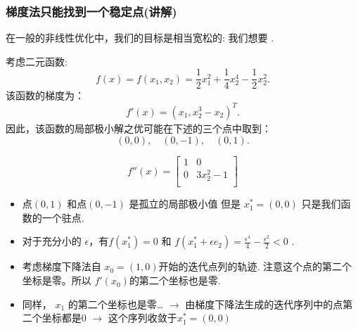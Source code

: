 \documentclass[handout]{beamer}
\begin{document}
\begin{frame}[allowframebreaks]
\frametitle{梯度法只能找到一个稳定点(讲解)}

 在一般的非线性优化中，我们的目标是相当宽松的:
我们想要 .


\begin{example}\label{example_1_2_2}
    考虑二元函数:
    $$
        f(x) = f(x_1,x_2) = \frac{1}{2}x_1^2 + \frac{1}{4} x_2^4 - \frac{1}{2} x_2^2.
    $$
   该函数的梯度为：
    $$
        f'(x) = (x_1,x_2^3 - x_2)_{}^{T}.
     $$
    因此，该函数的局部极小解之优可能在下述的三个点中取到：
    $$
        (0,0), \quad (0,-1), \quad (0,1).
    $$
\end{example}
\framebreak
{}
    $$
        f''(x) = \left[\begin{array}{cc}
                    1 & 0 \\
                    0 & 3x_2^2 -1 \\
                     \end{array}\right]
    $$


\begin{itemize}
\item   点$(0,1)$ 和点$(0,-1)$ 是孤立的局部极小值
但是 $x_1^*=(0,0)$ 只是我们函数的一个驻点.
   \item 对于充分小的 $\epsilon$，有$f(x_1^*) = 0$ 和 $f(x_1^* + \epsilon e_2) = \frac{\epsilon^4}{4} - \frac{\epsilon^2}{2}<0$  .

    \item 考虑梯度下降法自 $x_0 = (1,0)$开始的迭代点列的轨迹.
    注意这个点的第二个坐标是零。所以 $f'(x_0)$的第二个坐标也是零.
   \item 同样， $x_1$ 的第二个坐标也是零…
    $\rightarrow$ 由梯度下降法生成的迭代序列中的点第二个坐标都是0 
     $\rightarrow$  这个序列收敛于$x_1^*=(0,0)$
\end{itemize}

\end{frame}
\end{document}
